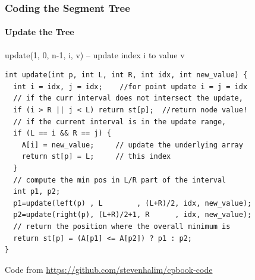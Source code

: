 \begin{frame}[fragile]
  \frametitle{Coding the Segment Tree}
  \framesubtitle{Update the Tree}

{\smaller
\begin{block}{update(1, 0, n-1, i, v) -- update index i to value v}
\begin{verbatim}
int update(int p, int L, int R, int idx, int new_value) {
  int i = idx, j = idx;    //for point update i = j = idx
  // if the curr interval does not intersect the update,
  if (i > R || j < L) return st[p];  //return node value!
  // if the current interval is in the update range,
  if (L == i && R == j) {
    A[i] = new_value;     // update the underlying array
    return st[p] = L;     // this index
  }
  // compute the min pos in L/R part of the interval
  int p1, p2;
  p1=update(left(p) , L        , (L+R)/2, idx, new_value);
  p2=update(right(p), (L+R)/2+1, R      , idx, new_value);
  // return the position where the overall minimum is
  return st[p] = (A[p1] <= A[p2]) ? p1 : p2;
}
\end{verbatim}
\end{block}}
\hfill\footnotesize{Code from \url{https://github.com/stevenhalim/cpbook-code}}

\end{frame}
